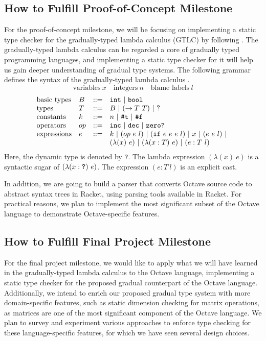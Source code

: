 \subsection{How to Fulfill Proof-of-Concept Milestone}
For the proof-of-concept milestone, we will be focusing on implementing a static
type checker for the gradually-typed lambda calculus (GTLC) by following
\cite{siek2012interpretations}. The gradually-typed lambda calculus can be
regarded a core of gradually typed programming languages, and implementing a
static type checker for it will help us gain deeper understanding of gradual
type systems. The following grammar defines the syntax of the gradually-typed
lambda calculus \cite{siek2012interpretations}.
$$ \text{variables} \ x \quad \text{integers} \ n \quad \text{blame labels} \ l $$
$$
\begin{array}{llll}
    \text{basic types} & B & ::= & \text{\tt int} \ | \ \text{\tt bool} \\
    \text{types} & T & ::= & B \ | \ (\rightarrow T \ T) \ | \ \text{?} \\
    \text{constants} & k & ::= & n \ | \ \text{\tt \#t} \ | \ \text{\tt \#f} \\
    \text{operators} & op & ::= & \text{\tt inc} \ | \ \text{\tt dec} \ | \ \text{\tt zero?} \\
    \text{expressions} & e & ::= & k \ | \ (op \ e \ l) \ | \ (\text{\tt if} \ e \ e \ e \ l) \ | \ x \ | \ (e \ e \ l) \ | \ \\
    & & & (\lambda (x) \ e) \ | \ (\lambda (x : T) \ e) \ | \ (e : T \ l)
\end{array}
$$
Here, the dynamic type is denoted by {\tt ?}. The lambda expression
$(\lambda(x) \ e)$ is a syntactic sugar of $(\lambda(x : \text{\tt ?}) \ e)$.
The expression $(e : T \ l)$ is an explicit cast.

In addition, we are going to build a parser that converts Octave source code to
abstract syntax trees in Racket, using parsing tools available in Racket. For
practical reasons, we plan to implement the most significant subset of the
Octave language to demonstrate Octave-specific features.

\subsection{How to Fulfill Final Project Milestone}
For the final project milestone, we would like to apply what we will have
learned in the gradually-typed lambda calculus to the Octave language,
implementing a static type checker for the proposed gradual counterpart of the
Octave language. Additionally, we intend to enrich our proposed gradual type
system with more domain-specific features, such as static dimension checking for
matrix operations, as matrices are one of the most significant component of the
Octave language. We plan to survey and experiment various approaches to enforce
type checking for these language-specific features, for which we have seen
several design choices.

